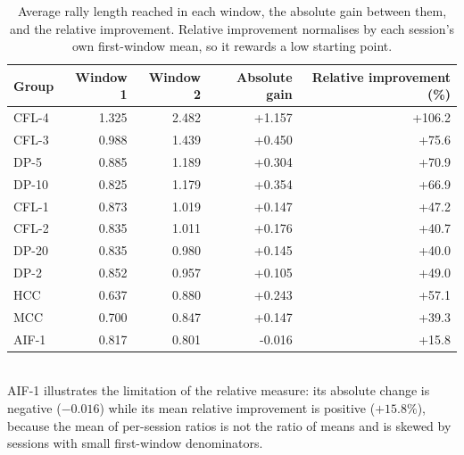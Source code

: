 \begin{table}[ht]
\centering
\caption{Average rally length reached in each window, the absolute gain between them, and the relative improvement. Relative improvement normalises by each session's own first-window mean, so it rewards a low starting point.}
\label{tab:level}
\begin{tabular}{lrrrr}
\toprule
Group & Window 1 & Window 2 & Absolute gain & Relative improvement (\%) \\
\midrule
CFL-4 & 1.325 & 2.482 & +1.157 & +106.2 \\
CFL-3 & 0.988 & 1.439 & +0.450 & +75.6 \\
DP-5 & 0.885 & 1.189 & +0.304 & +70.9 \\
DP-10 & 0.825 & 1.179 & +0.354 & +66.9 \\
CFL-1 & 0.873 & 1.019 & +0.147 & +47.2 \\
CFL-2 & 0.835 & 1.011 & +0.176 & +40.7 \\
DP-20 & 0.835 & 0.980 & +0.145 & +40.0 \\
DP-2 & 0.852 & 0.957 & +0.105 & +49.0 \\
HCC & 0.637 & 0.880 & +0.243 & +57.1 \\
MCC & 0.700 & 0.847 & +0.147 & +39.3 \\
AIF-1 & 0.817 & 0.801 & -0.016 & +15.8 \\
\bottomrule
\end{tabular}
\\[4pt]\footnotesize{AIF-1 illustrates the limitation of the relative measure: its absolute change is negative ($-0.016$) while its mean relative improvement is positive ($+15.8\%$), because the mean of per-session ratios is not the ratio of means and is skewed by sessions with small first-window denominators.}
\end{table}
